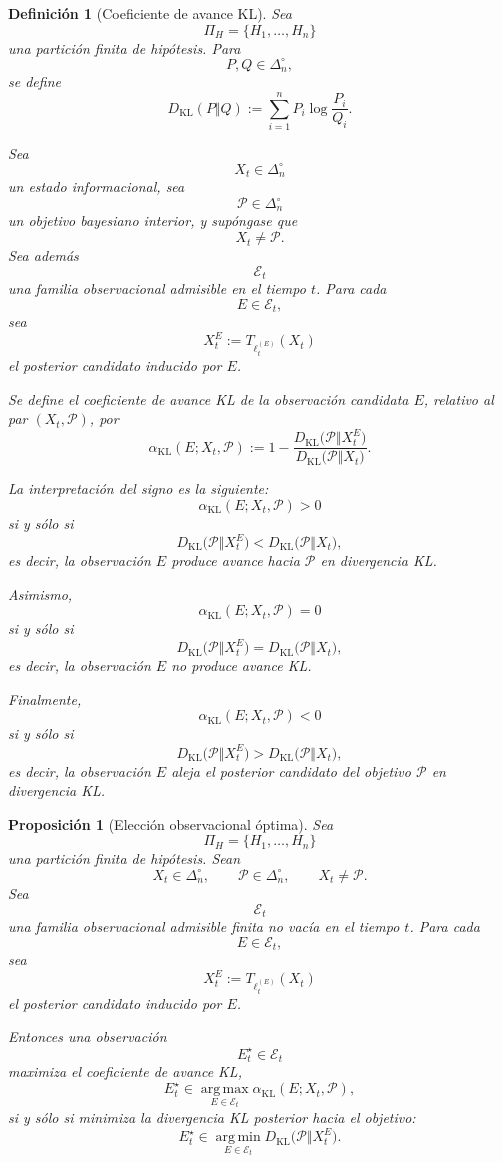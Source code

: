 ﻿\documentclass[12pt]{article}
\newtheorem{definicion}{Definición}[section]
\newtheorem{proposicion}{Proposición}[section]
\begin{document}
\begin{definicion}[Coeficiente de avance KL]
Sea
\[
\Pi_H=\{H_1,\dots,H_n\}
\]
una partición finita de hipótesis. Para
\[
P,Q\in\Delta_n^\circ,
\]
se define
\[
D_{\mathrm{KL}}(P\Vert Q)
:=
\sum_{i=1}^n P_i\log\frac{P_i}{Q_i}.
\]

Sea
\[
X_t\in\Delta_n^\circ
\]
un estado informacional, sea
\[
\mathcal P\in\Delta_n^\circ
\]
un objetivo bayesiano interior, y supóngase que
\[
X_t\neq \mathcal P.
\]
Sea además
\[
\mathcal E_t
\]
una familia observacional admisible en el tiempo \(t\). Para cada
\[
E\in\mathcal E_t,
\]
sea
\[
X_t^E:=T_{\ell_t^{(E)}}(X_t)
\]
el posterior candidato inducido por \(E\).

Se define el \emph{coeficiente de avance KL} de la observación candidata \(E\), relativo al par \((X_t,\mathcal P)\), por
\[
\alpha_{\mathrm{KL}}(E;X_t,\mathcal P)
:=
1-
\frac{
D_{\mathrm{KL}}\bigl(\mathcal P\Vert X_t^E\bigr)
}{
D_{\mathrm{KL}}\bigl(\mathcal P\Vert X_t\bigr)
}.
\]

La interpretación del signo es la siguiente:
\[
\alpha_{\mathrm{KL}}(E;X_t,\mathcal P)>0
\]
si y sólo si
\[
D_{\mathrm{KL}}\bigl(\mathcal P\Vert X_t^E\bigr)
<
D_{\mathrm{KL}}\bigl(\mathcal P\Vert X_t\bigr),
\]
es decir, la observación \(E\) produce avance hacia \(\mathcal P\) en divergencia KL.

Asimismo,
\[
\alpha_{\mathrm{KL}}(E;X_t,\mathcal P)=0
\]
si y sólo si
\[
D_{\mathrm{KL}}\bigl(\mathcal P\Vert X_t^E\bigr)
=
D_{\mathrm{KL}}\bigl(\mathcal P\Vert X_t\bigr),
\]
es decir, la observación \(E\) no produce avance KL.

Finalmente,
\[
\alpha_{\mathrm{KL}}(E;X_t,\mathcal P)<0
\]
si y sólo si
\[
D_{\mathrm{KL}}\bigl(\mathcal P\Vert X_t^E\bigr)
>
D_{\mathrm{KL}}\bigl(\mathcal P\Vert X_t\bigr),
\]
es decir, la observación \(E\) aleja el posterior candidato del objetivo \(\mathcal P\) en divergencia KL.
\end{definicion}


\begin{proposicion}[Elección observacional óptima]
Sea
\[
\Pi_H=\{H_1,\dots,H_n\}
\]
una partición finita de hipótesis. Sean
\[
X_t\in\Delta_n^\circ,
\qquad
\mathcal P\in\Delta_n^\circ,
\qquad
X_t\neq \mathcal P.
\]
Sea
\[
\mathcal E_t
\]
una familia observacional admisible finita no vacía en el tiempo \(t\). Para cada
\[
E\in\mathcal E_t,
\]
sea
\[
X_t^E:=T_{\ell_t^{(E)}}(X_t)
\]
el posterior candidato inducido por \(E\).

Entonces una observación
\[
E_t^\star\in\mathcal E_t
\]
maximiza el coeficiente de avance KL,
\[
E_t^\star
\in
\operatorname*{arg\,max}_{E\in\mathcal E_t}
\alpha_{\mathrm{KL}}(E;X_t,\mathcal P),
\]
si y sólo si minimiza la divergencia KL posterior hacia el objetivo:
\[
E_t^\star
\in
\operatorname*{arg\,min}_{E\in\mathcal E_t}
D_{\mathrm{KL}}\bigl(\mathcal P\Vert X_t^E\bigr).
\]
\end{proposicion}
\end{document}
